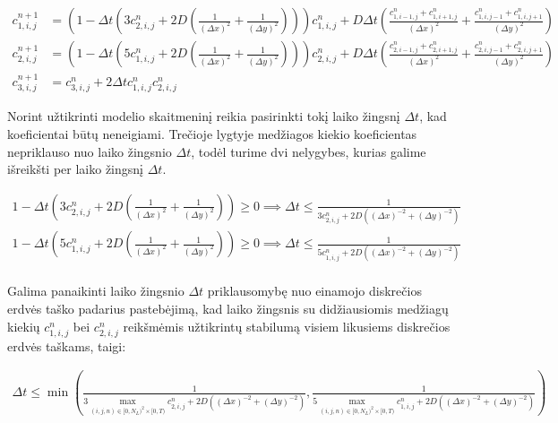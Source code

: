 \documentclass{article}
\begin{document}
\begin{subequations}
    \begin{align}
    c^{n+1}_{1,i,j}&=
    \left(1-\Delta t\left(3c^{n}_{2,i,j}+2D\left(\frac{1}{(\Delta x)^2}+\frac{1}{(\Delta y)^2}\right)\right)\right)c^n_{1,i,j}
    +D\Delta t\left(\frac{c^n_{1,i-1,j}+c^n_{1,i+1,j}}{(\Delta x)^2}+\frac{c^n_{1,i,j-1}+c^n_{1,i,j+1}}{(\Delta y)^2}\right)\\
    c^{n+1}_{2,i,j}&=
    \left(1-\Delta t\left(5c^{n}_{1,i,j}+2D\left(\frac{1}{(\Delta x)^2}+\frac{1}{(\Delta y)^2}\right)\right)\right)c^n_{2,i,j}
    +D\Delta t\left(\frac{c^n_{2,i-1,j}+c^n_{2,i+1,j}}{(\Delta x)^2}+\frac{c^n_{2,i,j-1}+c^n_{2,i,j+1}}{(\Delta y)^2}\right)\\
    c^{n+1}_{3,i,j}&=c^n_{3,i,j}+2\Delta tc^{n}_{1,i,j}c^{n}_{2,i,j}
    \end{align}
\end{subequations}

Norint užtikrinti modelio skaitmeninį reikia pasirinkti tokį laiko žingsnį $\Delta t$, kad koeficientai būtų neneigiami.
Trečioje lygtyje medžiagos kiekio koeficientas nepriklauso nuo laiko žingsnio $\Delta t$, todėl turime dvi nelygybes, kurias
galime išreikšti per laiko žingsnį $\Delta t$.

\begin{align*}
    1-\Delta t\left(3c^{n}_{2,i,j}+2D\left(\frac{1}{(\Delta x)^2}+\frac{1}{(\Delta y)^2}\right)\right) \geqslant 0\implies
    \Delta t\leqslant\frac{1}{3c^{n}_{2,i,j}+2D\left((\Delta x)^{-2}+(\Delta y)^{-2}\right)}\\
    1-\Delta t\left(5c^{n}_{1,i,j}+2D\left(\frac{1}{(\Delta x)^2}+\frac{1}{(\Delta y)^2}\right)\right) \geqslant 0\implies
    \Delta t\leqslant\frac{1}{5c^{n}_{1,i,j}+2D\left((\Delta x)^{-2}+(\Delta y)^{-2}\right)}\\
\end{align*}

Galima panaikinti laiko žingsnio $\Delta t$ priklausomybę nuo einamojo diskrečios erdvės taško padarius pastebėjimą,
kad laiko žingsnis su didžiausiomis medžiagų kiekių $c^n_{1,i,j}$ bei $c^n_{2,i,j}$ reikšmėmis užtikrintų stabilumą visiem
likusiems diskrečios erdvės taškams, taigi:

\begin{align*}
    \Delta t\leqslant\min\left(
    \frac{1}{3\max\limits_{(i,j,n)\in[0,N_L)^2\times[0,T)}c^{n}_{2,i,j}+2D\left((\Delta x)^{-2}+(\Delta y)^{-2}\right)},
    \frac{1}{5\max\limits_{(i,j,n)\in[0,N_L)^2\times[0,T)}c^{n}_{1,i,j}+2D\left((\Delta x)^{-2}+(\Delta y)^{-2}\right)}
    \right)
\end{align*}
\end{document}
